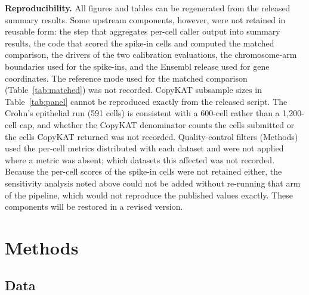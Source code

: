 \documentclass[11pt,letterpaper]{article}
\begin{document}
\textbf{Reproducibility.} All figures and tables can be regenerated from the released summary results. Some upstream components, however, were not retained in reusable form: the step that aggregates per-cell caller output into summary results, the code that scored the spike-in cells and computed the matched comparison, the drivers of the two calibration evaluations, the chromosome-arm boundaries used for the spike-ins, and the Ensembl release used for gene coordinates. The reference mode used for the matched comparison (Table~\ref{tab:matched}) was not recorded. CopyKAT subsample sizes in Table~\ref{tab:panel} cannot be reproduced exactly from the released script. The Crohn's epithelial run (591 cells) is consistent with a 600-cell rather than a 1{,}200-cell cap, and whether the CopyKAT denominator counts the cells submitted or the cells CopyKAT returned was not recorded. Quality-control filters (Methods) used the per-cell metrics distributed with each dataset and were not applied where a metric was absent; which datasets this affected was not recorded. Because the per-cell scores of the spike-in cells were not retained either, the sensitivity analysis noted above could not be added without re-running that arm of the pipeline, which would not reproduce the published values exactly. These components will be restored in a revised version.

\section{Methods}

\subsection{Data}
\end{document}
